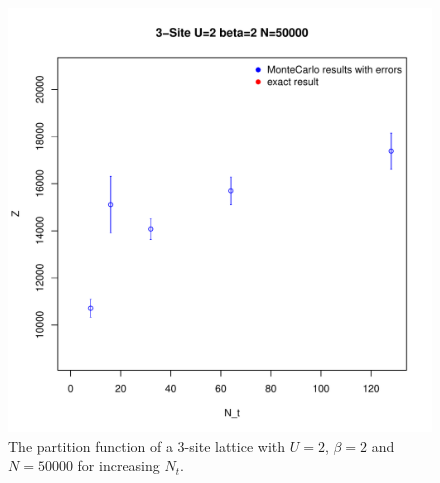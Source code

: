 \begin{figure}[H]
	\centering
	\includegraphics[width=0.5\linewidth]{figs/plot_Z3Nt}
	\caption[L3 Partition function]{The partition function of a 3-site lattice with $U=2$, $\beta=2$ and $N=50000$ for increasing $N_t$.}
	\label{fig:plotz3nt}
\end{figure}